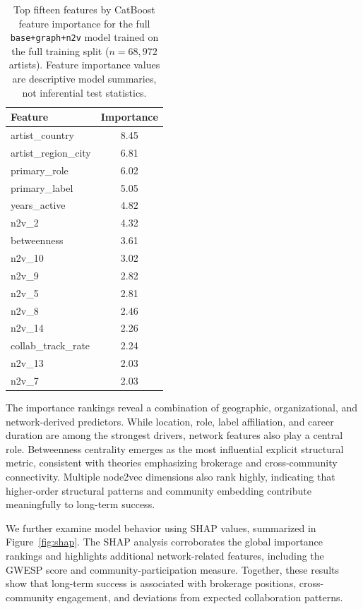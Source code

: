 \documentclass[fleqn,10pt]{wlscirep}
\begin{document}
\begin{table}[t]
\centering
\caption{Top fifteen features by CatBoost feature importance for the full \texttt{base+graph+n2v} model trained on the full training split ($n=68{,}972$ artists). Feature importance values are descriptive model summaries, not inferential test statistics.}
\label{tab:feature_importance}
\begin{tabular}{lc}
\hline
Feature & Importance \\
\hline
artist\_country      & 8.45 \\
artist\_region\_city & 6.81 \\
primary\_role        & 6.02 \\
primary\_label       & 5.05 \\
years\_active        & 4.82 \\
n2v\_2               & 4.32 \\
betweenness          & 3.61 \\
n2v\_10              & 3.02 \\
n2v\_9               & 2.82 \\
n2v\_5               & 2.81 \\
n2v\_8               & 2.46 \\
n2v\_14              & 2.26 \\
collab\_track\_rate  & 2.24 \\
n2v\_13              & 2.03 \\
n2v\_7               & 2.03 \\
\hline
\end{tabular}
\end{table}

The importance rankings reveal a combination of geographic, organizational, and network-derived predictors. While location, role, label affiliation, and career duration are among the strongest drivers, network features also play a central role. Betweenness centrality emerges as the most influential explicit structural metric, consistent with theories emphasizing brokerage and cross-community connectivity. Multiple node2vec dimensions also rank highly, indicating that higher-order structural patterns and community embedding contribute meaningfully to long-term success.

We further examine model behavior using SHAP values, summarized in Figure~\ref{fig:shap}. The SHAP analysis corroborates the global importance rankings and highlights additional network-related features, including the GWESP score and community-participation measure. Together, these results show that long-term success is associated with brokerage positions, cross-community engagement, and deviations from expected collaboration patterns.
\end{document}
